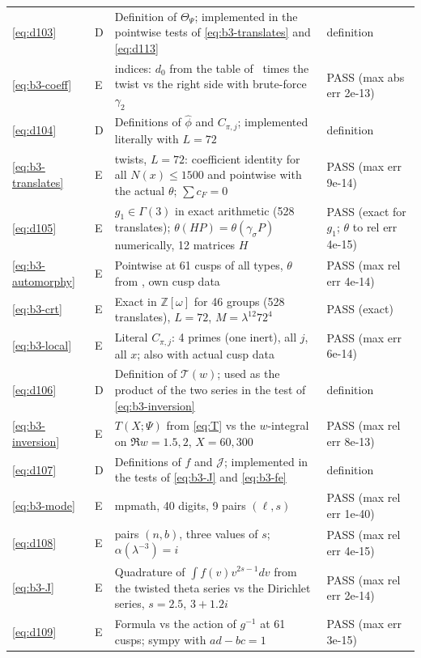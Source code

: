 \documentclass[11pt]{article}
\numberwithin{equation}{section}
\begin{document}
\begin{longtable}{@{}>{\raggedright\arraybackslash}p{1.2cm}>{\centering\arraybackslash}p{0.7cm}>{\raggedright\arraybackslash}p{9.05cm}>{\raggedright\arraybackslash}p{4.3cm}@{}}
\eqref{eq:d103} & D & Definition of $\Theta_\Psi$; implemented in the pointwise tests of \eqref{eq:b3-translates} and \eqref{eq:d113} & definition\\
\eqref{eq:b3-coeff} & E & 3424 indices: $d_0$ from the table of~\cite{QF} times the twist vs the right side with brute-force $\gamma_2$ & PASS (max abs err 2e-13)\\
\eqref{eq:d104} & D & Definitions of $\hat\phi$ and $C_{\pi,j}$; implemented literally with $L=72$ & definition\\
\eqref{eq:b3-translates} & E & 8 twists, $L=72$: coefficient identity for all $N(x)\le1500$ and pointwise with the actual $\theta$; $\sum c_F=0$ & PASS (max err 9e-14)\\
\eqref{eq:d105} & E & $g_1\in\Gamma(3)$ in exact arithmetic (528 translates); $\theta(HP)=\theta(\gamma_\sigma P)$ numerically, 12 matrices $H$ & PASS (exact for $g_1$; $\theta$ to rel err 4e-15)\\
\eqref{eq:b3-automorphy} & E & Pointwise at 61 cusps of all types, $\theta$ from \cite[Theorem~23]{QF}, own cusp data & PASS (max rel err 4e-14)\\
\eqref{eq:b3-crt} & E & Exact in $\mathbb Z[\omega]$ for 46 groups (528 translates), $L=72$, $M=\lambda^{12}72^4$ & PASS (exact)\\
\eqref{eq:b3-local} & E & Literal $C_{\pi,j}$: 4 primes (one inert), all $j$, all $x$; also with actual cusp data & PASS (max err 6e-14)\\
\eqref{eq:d106} & D & Definition of $\mathcal T(w)$; used as the product of the two series in the test of \eqref{eq:b3-inversion} & definition\\
\eqref{eq:b3-inversion} & E & $T(X;\Psi)$ from \eqref{eq:T} vs the $w$-integral on $\Re w=1.5,2$, $X=60,300$ & PASS (max rel err 8e-13)\\
\eqref{eq:d107} & D & Definitions of $f$ and $\mathcal J$; implemented in the tests of \eqref{eq:b3-J} and \eqref{eq:b3-fe} & definition\\
\eqref{eq:b3-mode} & E & mpmath, 40 digits, 9 pairs $(\ell,s)$ & PASS (max rel err 1e-40)\\
\eqref{eq:d108} & E & 720 pairs $(n,b)$, three values of $s$; $\alpha(\lambda^{-3})=i$ & PASS (max rel err 4e-15)\\
\eqref{eq:b3-J} & E & Quadrature of $\int f(v)v^{2s-1}dv$ from the twisted theta series vs the Dirichlet series, $s=2.5$, $3+1.2i$ & PASS (max rel err 2e-14)\\
\eqref{eq:d109} & E & Formula vs the action of $g^{-1}$ at 61 cusps; sympy with $ad-bc=1$ & PASS (max err 3e-15)\\

\end{longtable}
\end{document}
